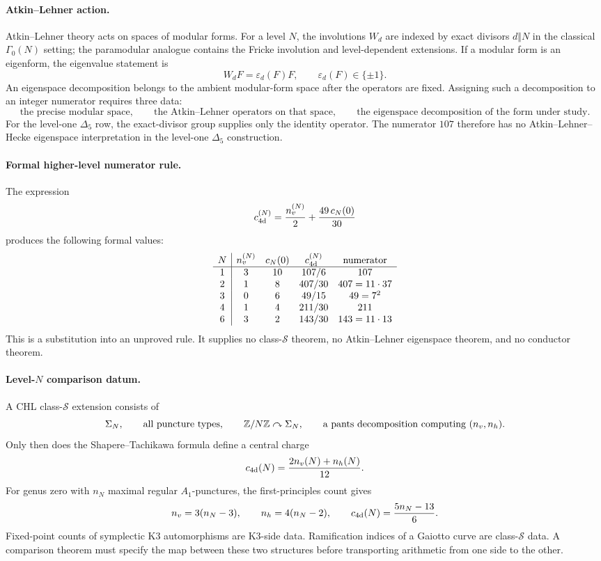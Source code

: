 \paragraph{Atkin--Lehner action.}
Atkin--Lehner theory acts on spaces of modular forms. For a level \(N\),
the involutions \(W_d\) are indexed by exact divisors \(d\Vert N\) in the
classical \(\Gamma_0(N)\) setting; the paramodular analogue contains the
Fricke involution and level-dependent extensions. If a modular form is
an eigenform, the eigenvalue statement is
\[
  W_d F=\varepsilon_d(F)F,\qquad \varepsilon_d(F)\in\{\pm1\}.
\]
An eigenspace decomposition belongs to the ambient modular-form space
after the operators are fixed. Assigning such a decomposition to an
integer numerator requires three data:
\[
  \text{the precise modular space},\qquad
  \text{the Atkin--Lehner operators on that space},\qquad
  \text{the eigenspace decomposition of the form under study}.
\]
For the level-one \(\Delta_5\) row, the exact-divisor group supplies only
the identity operator. The numerator \(107\) therefore has no
Atkin--Lehner--Hecke eigenspace interpretation in the level-one
\(\Delta_5\) construction.

\paragraph{Formal higher-level numerator rule.}
The expression
\[
  c_{\mathrm{4d}}^{(N)}
  =
  \frac{n_v^{(N)}}{2}
  +
  \frac{49\,c_N(0)}{30}
\]
produces the following formal values:
\[
  \begin{array}{c|cccc}
    N & n_v^{(N)} & c_N(0) & c_{\mathrm{4d}}^{(N)} & \text{numerator} \\ \hline
    1 & 3 & 10 & 107/6 & 107 \\
    2 & 1 & 8  & 407/30 & 407=11\cdot 37 \\
    3 & 0 & 6  & 49/15 & 49=7^2 \\
    4 & 1 & 4  & 211/30 & 211 \\
    6 & 3 & 2  & 143/30 & 143=11\cdot 13
  \end{array}
\]
This is a substitution into an unproved rule. It supplies no
class-\(\mathcal{S}\) theorem, no Atkin--Lehner eigenspace theorem, and
no conductor theorem.

\paragraph{Level-\(N\) comparison datum.}
A CHL class-\(\mathcal{S}\) extension consists of
\[
  \Sigma_N,\qquad
  \text{all puncture types},\qquad
  \mathbb{Z}/N\mathbb{Z}\curvearrowright\Sigma_N,\qquad
  \text{a pants decomposition computing }(n_v,n_h).
\]
Only then does the Shapere--Tachikawa formula define a central charge
\[
  c_{\mathrm{4d}}(N)=\frac{2n_v(N)+n_h(N)}{12}.
\]
For genus zero with \(n_N\) maximal regular \(A_1\)-punctures, the
first-principles count gives
\[
  n_v=3(n_N-3),\qquad n_h=4(n_N-2),
  \qquad
  c_{\mathrm{4d}}(N)=\frac{5n_N-13}{6}.
\]
Fixed-point counts of symplectic K3 automorphisms are K3-side data.
Ramification indices of a Gaiotto curve are class-\(\mathcal{S}\) data.
A comparison theorem must specify the map between these two structures
before transporting arithmetic from one side to the other.

